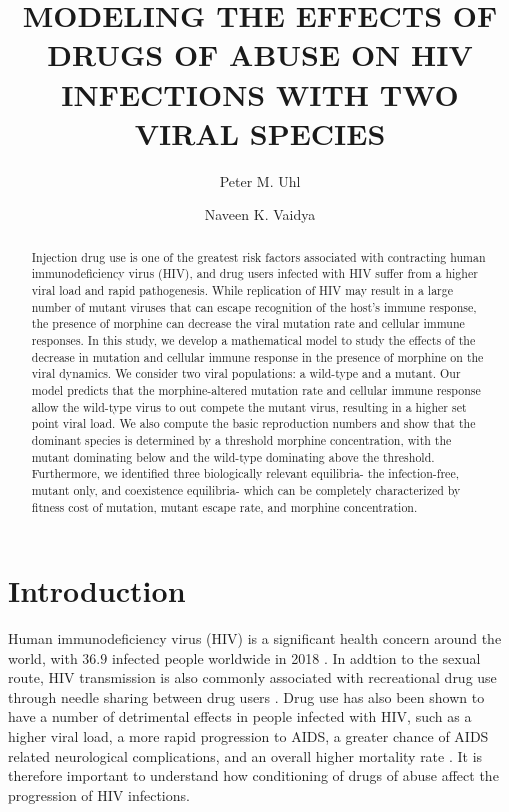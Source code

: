 \documentclass[11pt, oneside]{article}    %
\title{  MODELING THE EFFECTS OF DRUGS OF ABUSE ON HIV INFECTIONS WITH TWO VIRAL SPECIES}
\author[1,3]{Peter M. Uhl}
\author[1,2,3]{Naveen K. Vaidya}
\affil[1]{Computational Science Research Center, San Diego State University, San Diego, CA}
\affil[2]{Department of Mathematics and Statistics, San Diego State University, San Diego, CA}
\affil[3]{Viral Information Institute, San Diego State University, San Diego, CA}
\begin{document}
\maketitle

\begin{abstract}

Injection drug use is one of the greatest risk factors associated with contracting human immunodeficiency virus (HIV), and drug users infected with HIV suffer from a higher viral load and rapid pathogenesis. While replication of HIV may result in a large number of mutant viruses that can escape recognition of the host's immune response, the presence of morphine can decrease the viral mutation rate and cellular immune responses. In this study, we develop a mathematical model to study the effects of the decrease in mutation and cellular immune response in the presence of morphine on the viral dynamics. We consider two viral populations: a wild-type and a mutant. Our model predicts that the morphine-altered mutation rate and cellular immune response allow the wild-type virus to out compete the mutant virus, resulting in a higher set point viral load. We also compute the basic reproduction numbers and show that the dominant species is determined by a threshold morphine concentration, with the mutant dominating below and the wild-type dominating above the threshold. Furthermore, we identified three biologically relevant equilibria- the infection-free, mutant only, and coexistence equilibria- which can be completely characterized by fitness cost of mutation, mutant escape rate, and morphine concentration.

\end{abstract}

\section{Introduction}

	Human immunodeficiency virus (HIV) is a significant health concern around the world, with $36.9$ infected people worldwide in 2018 \cite{unaids}. In addtion to the sexual route, HIV transmission is also commonly associated with recreational drug use through needle sharing between drug users \cite{Alcabes}. Drug use has also been shown to have a number of detrimental effects in people infected with HIV, such as a higher viral load, a more rapid progression to AIDS, a greater chance of AIDS related neurological complications, and an overall higher mortality rate \cite{Kohli, Kumar, Hauser, Li}. It is therefore important to understand how conditioning of drugs of abuse affect the progression of HIV infections. 
\end{document}
